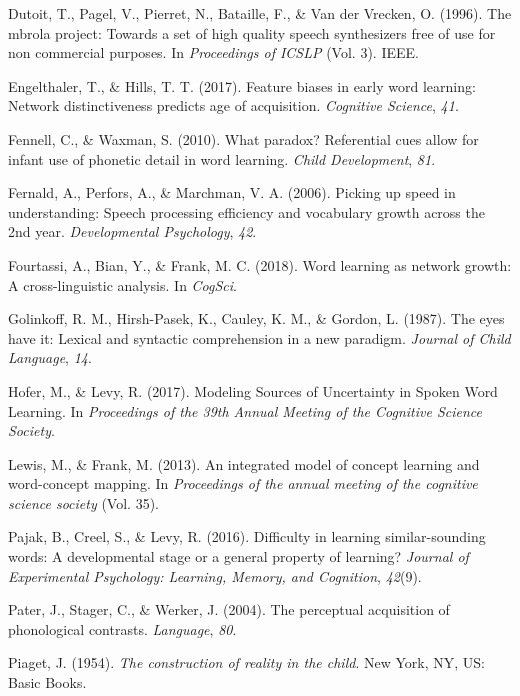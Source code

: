 \documentclass[english,,man,floatsintext]{apa6}
\theoremstyle{definition}
\theoremstyle{definition}
\theoremstyle{definition}
\theoremstyle{remark}
\begin{document}
\hypertarget{ref-dutoit1996}{}
Dutoit, T., Pagel, V., Pierret, N., Bataille, F., \& Van der Vrecken, O.
(1996). The mbrola project: Towards a set of high quality speech
synthesizers free of use for non commercial purposes. In
\emph{Proceedings of ICSLP} (Vol. 3). IEEE.

\hypertarget{ref-engelthaler2017}{}
Engelthaler, T., \& Hills, T. T. (2017). Feature biases in early word
learning: Network distinctiveness predicts age of acquisition.
\emph{Cognitive Science}, \emph{41}.

\hypertarget{ref-fennell2010}{}
Fennell, C., \& Waxman, S. (2010). What paradox? Referential cues allow
for infant use of phonetic detail in word learning. \emph{Child
Development}, \emph{81}.

\hypertarget{ref-fernald2006}{}
Fernald, A., Perfors, A., \& Marchman, V. A. (2006). Picking up speed in
understanding: Speech processing efficiency and vocabulary growth across
the 2nd year. \emph{Developmental Psychology}, \emph{42}.

\hypertarget{ref-fourtassi2018}{}
Fourtassi, A., Bian, Y., \& Frank, M. C. (2018). Word learning as
network growth: A cross-linguistic analysis. In \emph{CogSci}.

\hypertarget{ref-golinkoff1987}{}
Golinkoff, R. M., Hirsh-Pasek, K., Cauley, K. M., \& Gordon, L. (1987).
The eyes have it: Lexical and syntactic comprehension in a new paradigm.
\emph{Journal of Child Language}, \emph{14}.

\hypertarget{ref-hofer2017}{}
Hofer, M., \& Levy, R. (2017). Modeling Sources of Uncertainty in Spoken
Word Learning. In \emph{Proceedings of the 39th Annual Meeting of the
Cognitive Science Society}.

\hypertarget{ref-lewis2013}{}
Lewis, M., \& Frank, M. (2013). An integrated model of concept learning
and word-concept mapping. In \emph{Proceedings of the annual meeting of
the cognitive science society} (Vol. 35).

\hypertarget{ref-pajak2016}{}
Pajak, B., Creel, S., \& Levy, R. (2016). Difficulty in learning
similar-sounding words: A developmental stage or a general property of
learning? \emph{Journal of Experimental Psychology: Learning, Memory,
and Cognition}, \emph{42}(9).

\hypertarget{ref-pater2004}{}
Pater, J., Stager, C., \& Werker, J. (2004). The perceptual acquisition
of phonological contrasts. \emph{Language}, \emph{80}.

\hypertarget{ref-piaget1954}{}
Piaget, J. (1954). \emph{The construction of reality in the child}. New
York, NY, US: Basic Books.
\end{document}
